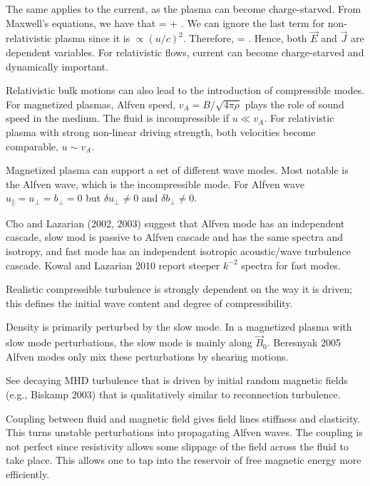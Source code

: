 \documentclass[usenatbib,twocolumn]{aastex63}
\begin{document}
The same applies to the current, as the plasma can become charge-starved.
From Maxwell's equations, we have that
\be
\nabla \times {} =   +  .
\ee
We can ignore the last term for non-relativistic plasma since it is $\propto (u/c)^2$.
Therefore, 
\be
{} =  \nabla\times{}.
\ee
Hence, both $\vec{E}$ and $\vec{J}$ are dependent variables.
For relativistic flows, current can become charge-starved and dynamically important.

Relativistic bulk motions can also lead to the introduction of compressible modes.
For magnetized plasmas, Alfven speed, $v_A = B/\sqrt{4\pi\rho}$ plays the role of sound speed in the medium.
The fluid is incompressible if $u \ll v_A$.
For relativistic plasma with strong non-linear driving strength, both velocities become comparable, $u \sim v_A$.


Magnetized plasma can support a set of different wave modes.
Most notable is the Alfven wave, which is the incompressible mode.
For Alfven wave $u_\parallel = u_\perp = b_\perp = 0$ but $\delta u_\perp \ne 0$ and $\delta b_\perp \ne 0$.


Cho and Lazarian (2002, 2003) suggest that Alfven mode has an independent cascade, slow mod is passive to Alfven cascade and has the same spectra and isotropy, and fast mode has an independent isotropic acoustic/wave turbulence cascade.
Kowal and Lazarian 2010 report steeper $k^{-2}$ spectra for fast modes.

Realistic compressible turbulence is strongly dependent on the way it is driven;
this defines the initial wave content and degree of compressibility.

Density is primarily perturbed by the slow mode.
In a magnetized plasma with slow mode perturbations, the slow mode is mainly along $\vec{B}_0$.
Beresnyak 2005
Alfven modes only mix these perturbations by shearing motions.

See decaying MHD turbulence that is driven by initial random magnetic fields (e.g., Biskamp 2003) that is qualitatively similar to reconnection turbulence.


Coupling between fluid and magnetic field gives field lines stiffness and elasticity.
This turns unstable perturbations into propagating Alfven waves.
The coupling is not perfect since resistivity allows some slippage of the field across the fluid to take place.
This allows one to tap into the reservoir of free magnetic energy more efficiently.
\end{document}
